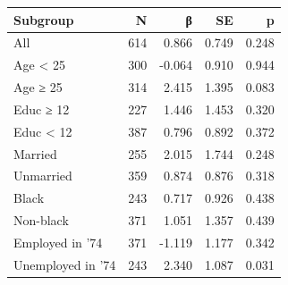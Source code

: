 \begin{tabular}{lrrrr}
\toprule
Subgroup & N & β & SE & p \\
\midrule
All & 614 & 0.866 & 0.749 & 0.248 \\
Age < 25 & 300 & -0.064 & 0.910 & 0.944 \\
Age ≥ 25 & 314 & 2.415 & 1.395 & 0.083 \\
Educ ≥ 12 & 227 & 1.446 & 1.453 & 0.320 \\
Educ < 12 & 387 & 0.796 & 0.892 & 0.372 \\
Married & 255 & 2.015 & 1.744 & 0.248 \\
Unmarried & 359 & 0.874 & 0.876 & 0.318 \\
Black & 243 & 0.717 & 0.926 & 0.438 \\
Non-black & 371 & 1.051 & 1.357 & 0.439 \\
Employed in '74 & 371 & -1.119 & 1.177 & 0.342 \\
Unemployed in '74 & 243 & 2.340 & 1.087 & 0.031 \\
\bottomrule
\end{tabular}
